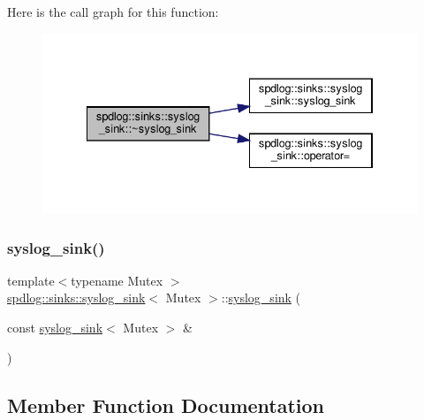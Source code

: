 Here is the call graph for this function\+:
\nopagebreak
\begin{figure}[H]
\begin{center}
\leavevmode
\includegraphics[width=334pt]{classspdlog_1_1sinks_1_1syslog__sink_ae440dafe6eca68065ac0b6438761ac38_cgraph}
\end{center}
\end{figure}
\mbox{\label{classspdlog_1_1sinks_1_1syslog__sink_a505adae200592eab1e093ab258ad0291}} 
\subsubsection{\texorpdfstring{syslog\+\_\+sink()}{syslog\_sink()}\hspace{0.1cm}{\footnotesize\ttfamily [2/2]}}
{\footnotesize\ttfamily template$<$typename Mutex $>$ \\
\hyperlink{classspdlog_1_1sinks_1_1syslog__sink}{spdlog\+::sinks\+::syslog\+\_\+sink}$<$ Mutex $>$\+::\hyperlink{classspdlog_1_1sinks_1_1syslog__sink}{syslog\+\_\+sink} (\begin{DoxyParamCaption}\item[{const \hyperlink{classspdlog_1_1sinks_1_1syslog__sink}{syslog\+\_\+sink}$<$ Mutex $>$ \&}]{ }\end{DoxyParamCaption})\hspace{0.3cm}{\ttfamily [delete]}}



\subsection{Member Function Documentation}
\mbox{\label{classspdlog_1_1sinks_1_1syslog__sink_a6afb5ba7ef5e5f2950e624ec650fb562}} 
